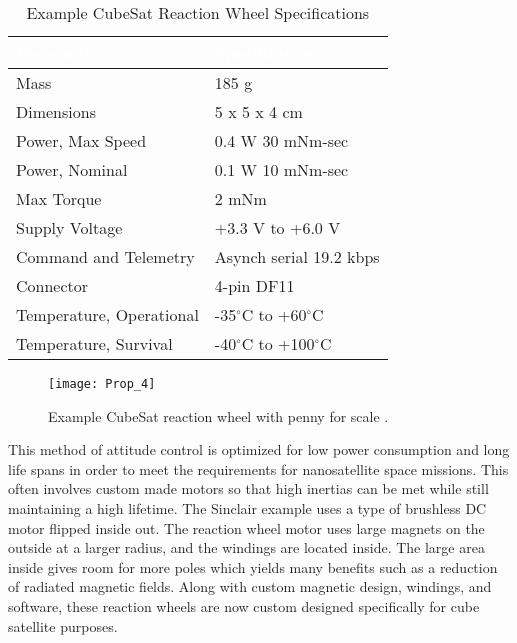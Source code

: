 \documentclass[nocover]            %
{CSLI}                       %
\begin{document}
\begin{table}[H]
\centering
\caption{Example CubeSat Reaction Wheel Specifications \cite{Sinclair}}
\begin{tabular}{| l | l |}
\arrayrulecolor{white}
\hline
\rowcolor{gray!80}
\textcolor{white}{\textbf{Parameter}} & \textcolor{white}{\textbf{Specification}} \\ \hline
\rowcolor{gray!10}
Mass & 185 g \\ \hline
\rowcolor{gray!5}
Dimensions & 5 x 5 x 4 cm \\ \hline
\rowcolor{gray!10}
Power, Max Speed &  0.4 W \@ 30 mNm-sec \\ \hline
\rowcolor{gray!5}
Power, Nominal &  0.1 W \@ 10 mNm-sec \\ \hline
\rowcolor{gray!10}
Max Torque & 2 mNm \\ \hline
\rowcolor{gray!5}
Supply Voltage & +3.3 V to +6.0 V \\ \hline
\rowcolor{gray!10}
Command and Telemetry & Asynch serial 19.2 kbps\\ \hline
\rowcolor{gray!5}
Connector & 4-pin DF11 \\ \hline
\rowcolor{gray!10}
Temperature, Operational & -35$^\circ$C to +60$^\circ$C \\ \hline
\rowcolor{gray!5}
Temperature, Survival & -40$^\circ$C to +100$^\circ$C \\ \hline
\end{tabular}
\end{table}

\begin{figure}[H]
\centering
    \texttt{[image: Prop\_4]}
    \caption{Example CubeSat reaction wheel with penny for scale \cite{Sinclair}.}
\end{figure}

This method of attitude control is optimized for low power consumption and long life spans in order to meet the requirements for nanosatellite space missions. This often involves custom made motors so that high inertias can be met while still maintaining a high lifetime. The Sinclair example uses a type of brushless DC motor flipped inside out. The reaction wheel motor uses large magnets on the outside at a larger radius, and the windings are located inside. The large area inside gives room for more poles which yields many benefits such as a reduction of radiated magnetic fields. Along with custom magnetic design, windings, and software, these reaction wheels are now custom designed specifically for cube satellite purposes. 
\end{document}

